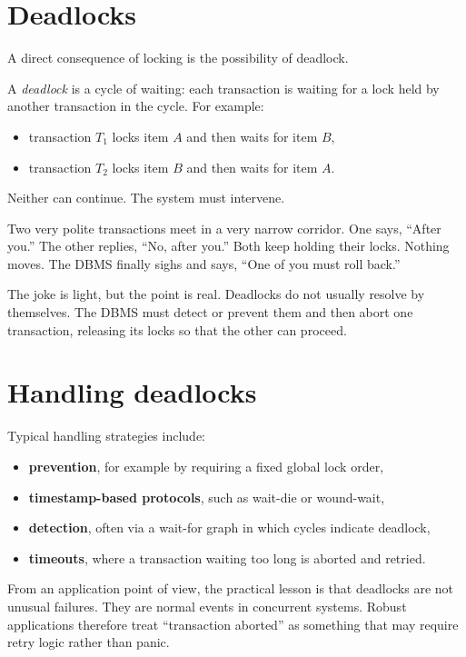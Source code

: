 \documentclass[11pt,a4paper,openany]{book}
\begin{document}
\section{Deadlocks}
A direct consequence of locking is the possibility of deadlock.

A \emph{deadlock} is a cycle of waiting: each transaction is waiting for a lock held by another transaction in the cycle. For example:
\begin{itemize}
\item transaction \(T_1\) locks item \(A\) and then waits for item \(B\),
\item transaction \(T_2\) locks item \(B\) and then waits for item \(A\).
\end{itemize}

Neither can continue. The system must intervene.

\begin{jokebox}
Two very polite transactions meet in a very narrow corridor. One says, ``After you.'' The other replies, ``No, after you.'' Both keep holding their locks. Nothing moves. The DBMS finally sighs and says, ``One of you must roll back.''
\end{jokebox}

The joke is light, but the point is real. Deadlocks do not usually resolve by themselves. The DBMS must detect or prevent them and then abort one transaction, releasing its locks so that the other can proceed.

\section{Handling deadlocks}
Typical handling strategies include:
\begin{itemize}
\item \textbf{prevention}, for example by requiring a fixed global lock order,
\item \textbf{timestamp-based protocols}, such as wait-die or wound-wait,
\item \textbf{detection}, often via a wait-for graph in which cycles indicate deadlock,
\item \textbf{timeouts}, where a transaction waiting too long is aborted and retried.
\end{itemize}

From an application point of view, the practical lesson is that deadlocks are not unusual failures. They are normal events in concurrent systems. Robust applications therefore treat ``transaction aborted'' as something that may require retry logic rather than panic.
\end{document}
